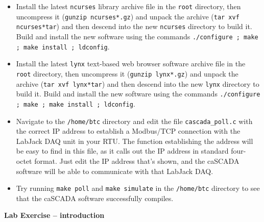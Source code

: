 \begin{itemize}
\begin{itemize}
\vskip 5pt
\item{} Install the latest {\tt ncurses} library archive file in the {\tt root} directory, then uncompress it ({\tt gunzip ncurses*.gz}) and unpack the archive ({\tt tar xvf ncurses*tar}) and then descend into the new {\tt ncurses} directory to build it.  Build and install the new software using the commands {\tt ./configure ; make ; make install ; ldconfig}.
\vskip 5pt
\item{} Install the latest {\tt lynx} text-based web browser software archive file in the {\tt root} directory, then uncompress it ({\tt gunzip lynx*.gz}) and unpack the archive ({\tt tar xvf lynx*tar}) and then descend into the new {\tt lynx} directory to build it.  Build and install the new software using the commands {\tt ./configure ; make ; make install ; ldconfig}.
\vskip 5pt
\item{} Navigate to the {\tt /home/btc} directory and edit the file {\tt cascada\_poll.c} with the correct IP address to establish a Modbus/TCP connection with the LabJack DAQ unit in your RTU.  The function establishing the address will be easy to find in this file, as it calls out the IP address in standard four-octet format.  Just edit the IP address that's shown, and the caSCADA software will be able to communicate with that LabJack DAQ.
\vskip 5pt
\item{} Try running {\tt make poll} and {\tt make simulate} in the {\tt /home/btc} directory to see that the caSCADA software successfully compiles.
\end{itemize}























\noindent
{\bf Lab Exercise -- introduction}


\end{itemize}
